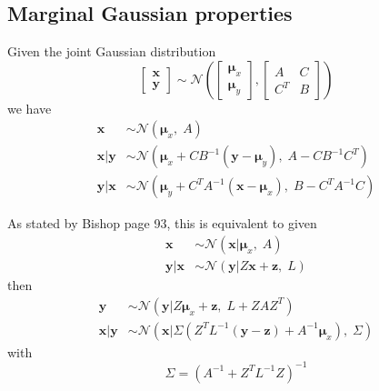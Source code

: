 \documentclass[5p,11pt]{article}
\begin{document}
\subsection{Marginal Gaussian properties}
Given the joint Gaussian distribution
\begin{equation}
\begin{bmatrix}\bm{x}\\ \bm{y}\end{bmatrix} \sim \mathcal{N}\left(\begin{bmatrix}\bm{\mu}_x\\ \bm{\mu}_y\end{bmatrix}, \begin{bmatrix}A & C\\C^T & B\end{bmatrix} \right)
\end{equation}
we have
\begin{equation}
\label{eq:marginal_gauss}
    \begin{aligned}
    \bm{x} &\sim \mathcal{N}(\bm{\mu}_x,\; A) \\
    \bm{x}|\bm{y} &\sim \mathcal{N}(\bm{\mu}_x + CB^{-1}(\bm{y}-\bm{\mu}_y),\; A-CB^{-1}C^T) \\
    \bm{y}|\bm{x} &\sim \mathcal{N}(\bm{\mu}_y + C^TA^{-1}(\bm{x}-\bm{\mu}_x),\; B-C^TA^{-1}C)
    \end{aligned}
\end{equation}

As stated by Bishop page 93, this is equivalent to given
\begin{equation}
    \begin{aligned}
\bm{x} &\sim \mathcal{N}(\bm{x}|\bm{\mu}_x,\; A) \\
\bm{y}|\bm{x} &\sim \mathcal{N}(\bm{y}|Z\bm{x}+\bm{z},\; L)     \end{aligned}
\end{equation}
then
\begin{equation}
    \begin{aligned}
\bm{y} &\sim \mathcal{N}(\bm{y}|Z\bm{\mu}_x+\bm{z},\; L + ZAZ^T) \\
\bm{x}|\bm{y} &\sim \mathcal{N}(\bm{x}|\Sigma (Z^TL^{-1}(\bm{y}-\bm{z}) + A^{-1}\bm{\mu}_x),\; \Sigma)
    \end{aligned}
\end{equation}
with
$$\Sigma = (A^{-1} + Z^TL^{-1}Z)^{-1}$$
\end{document}
